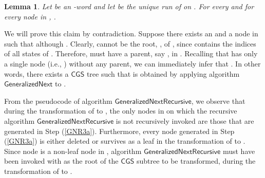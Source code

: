 \documentclass[3p]{elsarticle}
\newtheorem{lemma}[theorem]{Lemma}
\newcommand{\CGS}{\ensuremath{\textsf{CGS }}}
\newcommand{\algo}[1]{\ensuremath{\textsf{{#1}}}}
\begin{document}
\begin{lemma}\label{claim2} Let  be an -word and 
let  be the unique run of  on .
For every  and for every node  in , .
\end{lemma}

 We will prove this claim by contradiction.
Suppose there exists an  and a node  in  such that
 although .  Clearly, 
cannot be the root, , of , since  contains the indices of all states of .  Therefore, 
must have a parent, say , in .  Recalling that  has only
a single node (i.e., ) without any parent, we can immediately
infer that .  In other words, there exists a \CGS tree
 such that  is obtained by applying algorithm
\algo{GeneralizedNext} to .

From the pseudocode of algorithm \algo{GeneralizedNextRecursive}, we
observe that during the transformation of  to , the only
nodes in  on which the recursive algorithm \algo{GeneralizedNextRecursive} is
not recursively invoked are those that are generated in Step
(\ref{GNR3a}).  Furthermore, every node generated in Step
(\ref{GNR3a}) is either deleted or survives as a leaf in the
transformation of  to .  Since node  is a non-leaf
node in , algorithm \algo{GeneralizedNextRecursive} must have
been invoked with  as the root of the \CGS subtree to be
transformed, during the transformation of  to .
\end{document}
